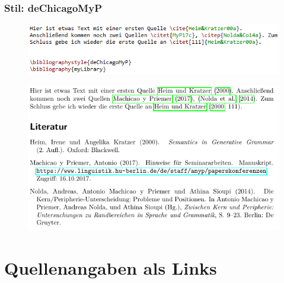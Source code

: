 \begin{frame}[fragile]
\frametitle{Stil: deChicagoMyP}

\begin{figure}
	\centering
	\includegraphics[width=.70\textwidth]{../../texfiles-beamer/tex-material/WissArb-latex/bib_deChicago_tex}
\end{figure}

\begin{figure}
	\centering
	\includegraphics[width=.70\textwidth]{../../texfiles-beamer/tex-material/WissArb-latex/bib_deChicago_pdf}
\end{figure}

\end{frame}


\section{Quellenangaben als Links}

